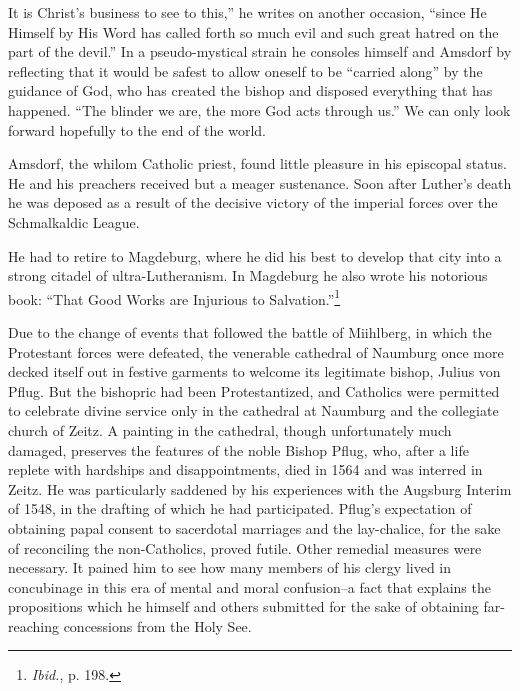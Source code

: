 It is Christ’s business to see to this,” he writes on another occasion, “since
He Himself by His Word has called forth so much evil and such great
hatred on the part of the devil.” In a pseudo-mystical strain he consoles
himself and Amsdorf by reflecting that it would be safest to allow oneself to be
“carried along” by the guidance of God, who has created the bishop and
disposed everything that has happened. “The blinder we are, the more God
acts through us.” We can only look forward hopefully to the end of the
world.

Amsdorf, the whilom Catholic priest, found little pleasure in his
episcopal status. He and his preachers received but a meager sustenance.
Soon after Luther’s death he was deposed as a result of the decisive victory
of the imperial forces over the Schmalkaldic League.

He had to retire to Magdeburg, where he did his best to develop that
city into a strong citadel of ultra-Lutheranism. In Magdeburg he also
wrote his notorious book: “That Good Works are Injurious to Salvation.”\footnote{\textit{Ibid.}, p. 198.}

Due to the change of events that followed the battle of Miihlberg,
in which the Protestant forces were defeated, the venerable cathedral
of Naumburg once more decked itself out in festive garments to welcome
its legitimate bishop, Julius von Pflug. But the bishopric had
been Protestantized, and Catholics were permitted to celebrate divine
service only in the cathedral at Naumburg and the collegiate church
of Zeitz. A painting in the cathedral, though unfortunately much
damaged, preserves the features of the noble Bishop Pflug, who, after
a life replete with hardships and disappointments, died in 1564 and
was interred in Zeitz. He was particularly saddened by his experiences
with the Augsburg Interim of 1548, in the drafting of which he had
participated. Pflug’s expectation of obtaining papal consent to sacerdotal
marriages and the lay-chalice, for the sake of reconciling the
non-Catholics, proved futile. Other remedial measures were necessary.
It pained him to see how many members of his clergy lived in
concubinage in this era of mental and moral confusion--a fact that
explains the propositions which he himself and others submitted
for the sake of obtaining far-reaching concessions from the Holy
See.

